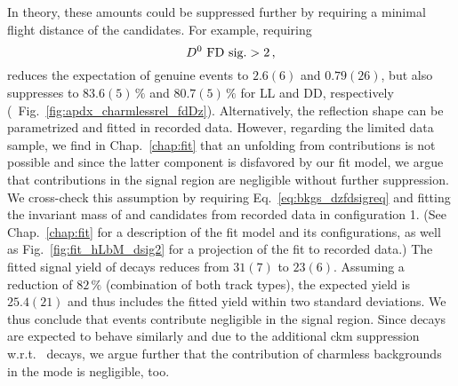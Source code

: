 In theory, these amounts could be suppressed further by requiring a minimal flight distance of the \Dz candidates.
For example, requiring
\begin{equation}
    \label{eq:bkgs_dzfdsigreq}
    \text{\Dz FD sig.} > 2 \,,
\end{equation}
reduces the expectation of genuine \decay{\Lb}{\Lz\Kp\Km} events to $2.6(6)$ and $0.79(26)$, but also suppresses \decay{\Lb}{\Dz\Lz} to $83.6(5)\,\%$ and $80.7(5)\,\%$ for \gls{LL} and \gls{DD}, respectively (\cf{}~Fig.~\ref{fig:apdx_charmlessrel_fdDz}).
Alternatively, the reflection shape can be parametrized and fitted in recorded data.
However, regarding the limited data sample, we find in Chap.~\ref{chap:fit} that an unfolding from \decay{\Xibz}{\Dstarz\Lz} contributions is not possible and since the latter component is disfavored by our fit model, we argue that \decay{\Lb}{\Lz\Kp\Km} contributions in the signal region are negligible without further suppression.
We cross-check this assumption by requiring Eq.~\eqref{eq:bkgs_dzfdsigreq} and fitting the invariant mass of \Dz and \Lz candidates from recorded data in configuration 1.
(See Chap.~\ref{chap:fit} for a description of the fit model and its configurations, as well as Fig.~\ref{fig:fit_hLbM_dsig2} for a projection of the fit to recorded data.)
The fitted signal yield of \decay{\Lb}{\Dz\Lz} decays reduces from $31(7)$ to $23(6)$.
Assuming a reduction of $82\,\%$ (combination of both track types), the expected yield is $25.4(21)$ and thus includes the fitted yield within two standard deviations.
We thus conclude that \decay{\Lb}{\Lz\Kp\Km} events contribute negligible in the signal region.
Since \decay{\Xibz}{\Lz\Km\pip} decays are expected to behave similarly and due to the additional \gls{ckm} suppression w.r.t.\ \decay{\Xibz}{\Dz\Lz} decays, we argue further that the contribution of charmless backgrounds in the \Xibz mode is negligible, too.

